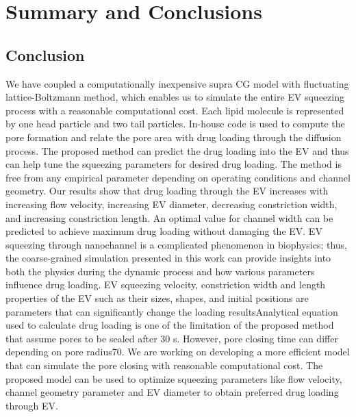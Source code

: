 \chapter{Summary and Conclusions}

\section{Conclusion}

We have coupled a computationally inexpensive supra CG model with fluctuating lattice-Boltzmann method, which enables us to simulate the entire EV squeezing process with a reasonable computational cost. Each lipid molecule is represented by one head particle and two tail particles. In-house code is used to compute the pore formation and relate the pore area with drug loading through the diffusion process. The proposed method can predict the drug loading into the EV and thus can help tune the squeezing parameters for desired drug loading. The method is free from any empirical parameter depending on operating conditions and channel geometry. Our results show that drug loading through the EV increases with increasing flow velocity, increasing EV diameter, decreasing constriction width, and increasing constriction length. An optimal value for channel width can be predicted to achieve maximum drug loading without damaging the EV. EV squeezing through nanochannel is a complicated phenomenon in biophysics; thus, the coarse-grained simulation presented in this work can provide insights into both the physics during the dynamic process and how various parameters influence drug loading. EV squeezing velocity, constriction width and length properties of the EV such as their sizes, shapes, and initial positions are parameters that can significantly change the loading resultsAnalytical equation used to calculate drug loading is one of the limitation of the proposed method that  assume pores to be sealed after 30 s. However, pore closing time can differ depending on pore radius70. We are working on developing a more efficient model that can simulate the pore closing with reasonable computational cost. The proposed model can be used to optimize squeezing parameters like flow velocity, channel geometry parameter and EV diameter to obtain preferred drug loading through EV.

